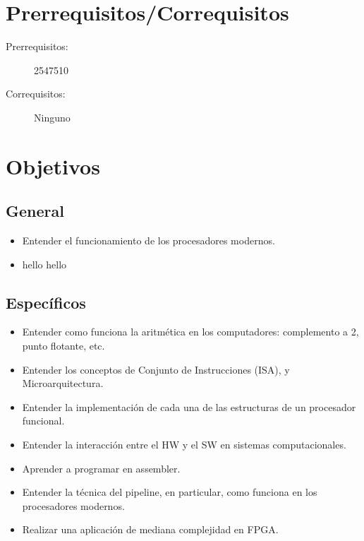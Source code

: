 \documentclass[11pt]{article}
\begin{document}
\section*{Prerrequisitos/Correquisitos}
\begin{description}
\item [Prerrequisitos:] 2547510
\item[Correquisitos:] Ninguno
\end{description}

\section*{Objetivos}

\subsection*{General}

\begin{itemize}
\item Entender el funcionamiento de los procesadores modernos. \item hello hello
\end{itemize}

\subsection*{Específicos}

\begin{itemize}
\item Entender como funciona la aritmética en los computadores: complemento a 2, punto flotante, etc. \item Entender los conceptos de Conjunto de Instrucciones (ISA), y Microarquitectura. \item Entender la implementación de cada una de las estructuras de un procesador funcional. \item Entender la interacción entre el HW y el SW en sistemas computacionales. \item Aprender a programar en assembler. \item Entender la técnica del pipeline, en particular, como funciona en los procesadores modernos. \item Realizar una aplicación de mediana complejidad en FPGA.
\end{itemize}

\end{document}
